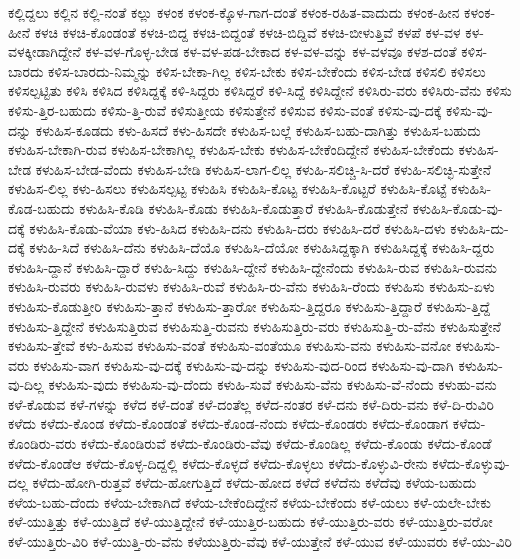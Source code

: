 {ಕಲ್ಲಿದ್ದಲು
ಕಲ್ಲಿನ
ಕಲ್ಲಿ-ನಂತೆ
ಕಲ್ಲು
ಕಳಂಕ
ಕಳಂಕ-ಕ್ಕೊಳ-ಗಾಗ-ದಂತೆ
ಕಳಂಕ-ರಹಿತ-ವಾದುದು
ಕಳಂಕ-ಹೀನ
ಕಳಂಕ-ಹೀನೆ
ಕಳಚಿ
ಕಳಚಿ-ಕೊಂಡಂತೆ
ಕಳಚಿ-ಬಿದ್ದ
ಕಳಚಿ-ಬಿದ್ದಂತೆ
ಕಳಚಿ-ಬಿದ್ದಿವೆ
ಕಳಚಿ-ಬೀಳುತ್ತಿವೆ
ಕಳಪೆ
ಕಳ-ವಳ
ಕಳ-ವಳಕ್ಕೀಡಾಗಿದ್ದೇನೆ
ಕಳ-ವಳ-ಗೊಳ್ಳ-ಬೇಡ
ಕಳ-ವಳ-ಪಡ-ಬೇಕಾದ
ಕಳ-ವಳ-ವನ್ನು
ಕಳ-ವಳವೂ
ಕಳಶ-ದಂತೆ
ಕಳಿಸ-ಬಾರದು
ಕಳಿಸ-ಬಾರದು-ನಿಮ್ಮನ್ನು
ಕಳಿಸ-ಬೇಕಾ-ಗಿಲ್ಲ
ಕಳಿಸ-ಬೇಕು
ಕಳಿಸ-ಬೇಕೆಂದು
ಕಳಿಸ-ಬೇಡ
ಕಳಿಸಲಿ
ಕಳಿಸಲು
ಕಳಿಸಲ್ಪಟ್ಟಿತು
ಕಳಿಸಿ
ಕಳಿಸಿದ
ಕಳಿಸಿದ್ದಕ್ಕೆ
ಕಳಿ-ಸಿದ್ದರು
ಕಳಿಸಿದ್ದರೆ
ಕಳಿ-ಸಿದ್ದೆ
ಕಳಿಸಿದ್ದೇನೆ
ಕಳಿಸಿರು-ವರು
ಕಳಿಸಿರು-ವೆನು
ಕಳಿಸು
ಕಳಿಸು-ತ್ತಿರ-ಬಹುದು
ಕಳಿಸು-ತ್ತಿ-ರುವೆ
ಕಳಿಸುತ್ತೀಯ
ಕಳಿಸುತ್ತೇನೆ
ಕಳಿಸುವ
ಕಳಿಸು-ವಂತೆ
ಕಳಿಸು-ವು-ದಕ್ಕೆ
ಕಳಿಸು-ವು-ದನ್ನು
ಕಳುಹಿಸ-ಕೂಡದು
ಕಳು-ಹಿಸದೆ
ಕಳು-ಹಿಸದೇ
ಕಳುಹಿಸ-ಬಲ್ಲೆ
ಕಳುಹಿಸ-ಬಹು-ದಾಗಿತ್ತು
ಕಳುಹಿಸ-ಬಹುದು
ಕಳುಹಿಸ-ಬೇಕಾಗಿ-ರುವ
ಕಳುಹಿಸ-ಬೇಕಾಗಿಲ್ಲ
ಕಳುಹಿಸ-ಬೇಕು
ಕಳುಹಿಸ-ಬೇಕೆಂದಿದ್ದೇನೆ
ಕಳುಹಿಸ-ಬೇಕೆಂದು
ಕಳುಹಿಸ-ಬೇಡ
ಕಳುಹಿಸ-ಬೇಡ-ವೆಂದು
ಕಳುಹಿಸ-ಬೇಡಿ
ಕಳುಹಿಸ-ಲಾಗ-ಲಿಲ್ಲ
ಕಳುಹಿ-ಸಲಿಚ್ಚಿ-ಸಿ-ದರೆ
ಕಳುಹಿ-ಸಲಿಚ್ಛಿ-ಸುತ್ತೇನೆ
ಕಳುಹಿಸ-ಲಿಲ್ಲ
ಕಳು-ಹಿಸಲು
ಕಳುಹಿಸಲ್ಪಟ್ಟ
ಕಳುಹಿಸಿ
ಕಳುಹಿಸಿ-ಕೊಟ್ಟ
ಕಳುಹಿಸಿ-ಕೊಟ್ಟರೆ
ಕಳುಹಿಸಿ-ಕೊಟ್ಟೆ
ಕಳುಹಿಸಿ-ಕೊಡ-ಬಹುದು
ಕಳುಹಿಸಿ-ಕೊಡಿ
ಕಳುಹಿಸಿ-ಕೊಡು
ಕಳುಹಿಸಿ-ಕೊಡುತ್ತಾರೆ
ಕಳುಹಿಸಿ-ಕೊಡುತ್ತೇನೆ
ಕಳುಹಿಸಿ-ಕೊಡು-ವು-ದಕ್ಕೆ
ಕಳುಹಿಸಿ-ಕೊಡು-ವೆಯಾ
ಕಳು-ಹಿಸಿದ
ಕಳುಹಿಸಿ-ದನು
ಕಳುಹಿಸಿ-ದರು
ಕಳುಹಿಸಿ-ದರೆ
ಕಳುಹಿಸಿ-ದಳು
ಕಳುಹಿಸಿ-ದು-ದಕ್ಕೆ
ಕಳುಹಿ-ಸಿದೆ
ಕಳುಹಿಸಿ-ದೆನು
ಕಳುಹಿಸಿ-ದೆಯೊ
ಕಳುಹಿಸಿ-ದೆಯೋ
ಕಳುಹಿಸಿದ್ದಕ್ಕಾಗಿ
ಕಳುಹಿಸಿದ್ದಕ್ಕೆ
ಕಳುಹಿಸಿ-ದ್ದರು
ಕಳುಹಿಸಿ-ದ್ದಾನೆ
ಕಳುಹಿಸಿ-ದ್ದಾರೆ
ಕಳುಹಿ-ಸಿದ್ದು
ಕಳುಹಿಸಿ-ದ್ದೇನೆ
ಕಳುಹಿಸಿ-ದ್ದೇನೆಂದು
ಕಳುಹಿಸಿ-ರುವ
ಕಳುಹಿಸಿ-ರುವನು
ಕಳುಹಿಸಿ-ರುವರು
ಕಳುಹಿಸಿ-ರುವಳು
ಕಳುಹಿಸಿ-ರುವೆ
ಕಳುಹಿಸಿ-ರು-ವೆನು
ಕಳುಹಿಸಿ-ರೆಂದು
ಕಳುಹಿಸು
ಕಳುಹಿಸು-ಏಳು
ಕಳುಹಿಸು-ಕೊಡುತ್ತೀರಿ
ಕಳುಹಿಸು-ತ್ತಾನೆ
ಕಳುಹಿಸು-ತ್ತಾರೋ
ಕಳುಹಿಸು-ತ್ತಿದ್ದರೂ
ಕಳುಹಿಸು-ತ್ತಿದ್ದಾರೆ
ಕಳುಹಿಸು-ತ್ತಿದ್ದೆ
ಕಳುಹಿಸು-ತ್ತಿದ್ದೇನೆ
ಕಳುಹಿಸುತ್ತಿರುವ
ಕಳುಹಿಸುತ್ತಿ-ರುವನು
ಕಳುಹಿಸುತ್ತಿರು-ವರು
ಕಳುಹಿಸುತ್ತಿ-ರು-ವೆನು
ಕಳುಹಿಸುತ್ತೇನೆ
ಕಳುಹಿಸು-ತ್ತೇವೆ
ಕಳು-ಹಿಸುವ
ಕಳುಹಿಸು-ವಂತೆ
ಕಳುಹಿಸು-ವಂತೆಯೂ
ಕಳುಹಿಸು-ವನು
ಕಳುಹಿಸು-ವನೋ
ಕಳುಹಿಸು-ವರು
ಕಳುಹಿಸು-ವಾಗ
ಕಳುಹಿಸು-ವು-ದಕ್ಕೆ
ಕಳುಹಿಸು-ವು-ದನ್ನು
ಕಳುಹಿಸು-ವುದ-ರಿಂದ
ಕಳುಹಿಸು-ವು-ದಾಗಿ
ಕಳುಹಿಸು-ವು-ದಿಲ್ಲ
ಕಳುಹಿಸು-ವುದು
ಕಳುಹಿಸು-ವು-ದೆಂದು
ಕಳುಹಿ-ಸುವೆ
ಕಳುಹಿಸು-ವೆನು
ಕಳುಹಿಸು-ವೆ-ನೆಂದು
ಕಳುಹು-ವನು
ಕಳೆ-ಕೊಡುವ
ಕಳೆ-ಗಳನ್ನು
ಕಳೆದ
ಕಳೆ-ದಂತೆ
ಕಳೆ-ದಂತೆಲ್ಲ
ಕಳೆದ-ನಂತರ
ಕಳೆ-ದನು
ಕಳೆ-ದಿರು-ವನು
ಕಳೆ-ದಿ-ರುವಿರಿ
ಕಳೆದು
ಕಳೆದು-ಕೊಂಡ
ಕಳೆದು-ಕೊಂಡಂತೆ
ಕಳೆದು-ಕೊಂಡ-ನೆಂದು
ಕಳೆದು-ಕೊಂಡರು
ಕಳೆದು-ಕೊಂಡಾಗ
ಕಳೆದು-ಕೊಂಡಿರು-ವರು
ಕಳೆದು-ಕೊಂಡಿರುವೆ
ಕಳೆದು-ಕೊಂಡಿರು-ವೆವು
ಕಳೆದು-ಕೊಂಡಿಲ್ಲ
ಕಳೆದು-ಕೊಂಡು
ಕಳೆದು-ಕೊಂಡೆ
ಕಳೆದು-ಕೊಂಡೆಆ
ಕಳೆದು-ಕೊಳ್ಳ-ದಿದ್ದಲ್ಲಿ
ಕಳೆದು-ಕೊಳ್ಳದೆ
ಕಳೆದು-ಕೊಳ್ಳಲು
ಕಳೆದು-ಕೊಳ್ಳುವಿ-ರೇನು
ಕಳೆದು-ಕೊಳ್ಳುವು-ದಲ್ಲ
ಕಳೆದು-ಹೋಗಿ-ರುತ್ತವೆ
ಕಳೆದು-ಹೋಗುತ್ತಿದೆ
ಕಳೆದು-ಹೋದ
ಕಳೆದೆ
ಕಳೆದೆನು
ಕಳೆದೆವು
ಕಳೆಯ-ಬಹುದು
ಕಳೆಯ-ಬಹು-ದೆಂದು
ಕಳೆಯ-ಬೇಕಾಗಿದೆ
ಕಳೆಯ-ಬೇಕೆಂದಿದ್ದೇನೆ
ಕಳೆಯ-ಬೇಕೆಂದು
ಕಳೆ-ಯಲು
ಕಳೆ-ಯಲೇ-ಬೇಕು
ಕಳೆ-ಯುತ್ತಿತ್ತು
ಕಳೆ-ಯುತ್ತಿದೆ
ಕಳೆ-ಯುತ್ತಿದ್ದೇನೆ
ಕಳೆ-ಯುತ್ತಿರ-ಬಹುದು
ಕಳೆ-ಯುತ್ತಿರು-ವರು
ಕಳೆ-ಯುತ್ತಿರು-ವರೋ
ಕಳೆ-ಯುತ್ತಿರು-ವಿರಿ
ಕಳೆ-ಯುತ್ತಿ-ರು-ವೆನು
ಕಳೆಯುತ್ತಿರು-ವೆವು
ಕಳೆ-ಯುತ್ತೇನೆ
ಕಳೆ-ಯುವ
ಕಳೆ-ಯುವರು
ಕಳೆ-ಯು-ವಿರಿ
}
